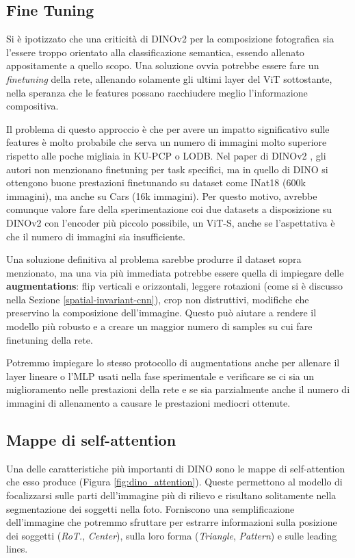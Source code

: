 \subsection{Fine Tuning}
Si è ipotizzato che una criticità di DINOv2 per la composizione fotografica sia l'essere troppo orientato alla classificazione semantica, essendo allenato appositamente a quello scopo. Una soluzione ovvia potrebbe essere fare un \textit{finetuning} della rete, allenando solamente gli ultimi layer del ViT sottostante, nella speranza che le features possano racchiudere meglio l'informazione compositiva. 

Il problema di questo approccio è che per avere un impatto significativo sulle features è molto probabile che serva un numero di immagini molto superiore rispetto alle poche migliaia in KU-PCP o LODB. Nel paper di DINOv2 \cite{dinov2}, gli autori non menzionano finetuning per task specifici, ma in quello di DINO \cite{dino} si ottengono buone prestazioni finetunando su dataset come INat18 (600k immagini), ma anche su Cars (16k immagini). Per questo motivo, avrebbe comunque valore fare della sperimentazione coi due datasets a disposizione su DINOv2 con l'encoder più piccolo possibile, un ViT-S, anche se l'aspettativa è che il numero di immagini sia insufficiente.

Una soluzione definitiva al problema sarebbe produrre il dataset sopra menzionato, ma una via più immediata potrebbe essere quella di impiegare delle \textbf{augmentations}: flip verticali e orizzontali, leggere rotazioni (come si è discusso nella Sezione \ref{spatial-invariant-cnn}), crop non distruttivi, modifiche che preservino la composizione dell'immagine. Questo può aiutare a rendere il modello più robusto e a creare un maggior numero di samples su cui fare finetuning della rete. 

Potremmo impiegare lo stesso protocollo di augmentations anche per allenare il layer lineare o l'MLP usati nella fase sperimentale e verificare se ci sia un miglioramento nelle prestazioni della rete e se sia parzialmente anche il numero di immagini di allenamento a causare le prestazioni mediocri ottenute.


\subsection{Mappe di self-attention}
Una delle caratteristiche più importanti di DINO sono le mappe di self-attention che esso produce (Figura \ref{fig:dino_attention}). Queste permettono al modello di focalizzarsi sulle parti dell'immagine più di rilievo e risultano solitamente nella segmentazione dei soggetti nella foto. Forniscono una semplificazione dell'immagine che potremmo sfruttare per estrarre informazioni sulla posizione dei soggetti (\textit{RoT.}, \textit{Center}), sulla loro forma (\textit{Triangle}, \textit{Pattern}) e sulle leading lines. 

